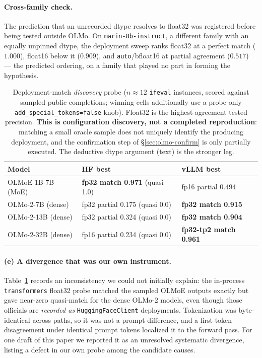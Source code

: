 \paragraph{Cross-family check.} The prediction that an unrecorded dtype resolves
to float32 was registered before being tested outside OLMo. On
\texttt{marin-8b-instruct}, a different family with an equally unpinned dtype, the
deployment sweep ranks float32 at a perfect match ($1.000$), float16 below it
($0.909$), and \texttt{auto}/bfloat16 at partial agreement ($0.517$) --- the
predicted ordering, on a family that played no part in forming the hypothesis.

\begin{table}[t]
\caption{Deployment-match \emph{discovery} probe ($n\approx 12$ \texttt{ifeval}
instances, scored against sampled public completions; winning cells additionally
use a probe-only \texttt{add\_special\_tokens=false} knob). Float32 is the
highest-agreement tested precision. \textbf{This is configuration discovery, not a
completed reproduction}: matching a small oracle sample does not uniquely identify
the producing deployment, and the confirmation step of \S\ref{sec:olmo-confirm}
is only partially executed. The deductive dtype argument (text) is the stronger leg.}
\label{tab:fp32}
\begin{center}
\small
\begin{tabular}{lll}
\toprule
\textbf{Model} & \textbf{HF best} & \textbf{vLLM best} \\
\midrule
OLMoE-1B-7B (MoE)   & \textbf{fp32 match 0.971} (quasi 1.0) & fp16 partial 0.494 \\
OLMo-2-7B (dense)   & fp32 partial 0.175 (quasi 0.0)       & \textbf{fp32 match 0.915} \\
OLMo-2-13B (dense)  & fp32 partial 0.324 (quasi 0.0)       & \textbf{fp32 match 0.904} \\
OLMo-2-32B (dense)  & fp16 partial 0.234 (quasi 0.0)       & \textbf{fp32-tp2 match 0.961} \\
\bottomrule
\end{tabular}
\end{center}
\end{table}

\paragraph{(e) A divergence that was our own instrument.} Table~\ref{tab:fp32}
records an inconsistency we could not initially explain: the in-process
\texttt{transformers} float32 probe matched the sampled OLMoE outputs exactly but
gave near-zero quasi-match for the dense OLMo-2 models, even though those
officials are \emph{recorded as} \texttt{HuggingFaceClient} deployments.
Tokenization was byte-identical across paths, so it was not a prompt difference,
and a first-token disagreement under identical prompt tokens localized it to the
forward pass. For one draft of this paper we reported it as an unresolved
systematic divergence, listing a defect in our own probe among the candidate
causes.

